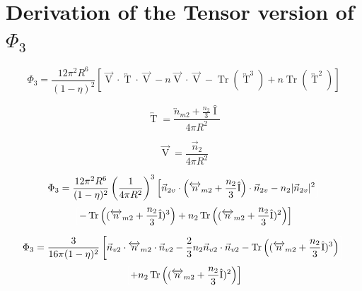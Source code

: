 \documentclass[double,12pt]{beavtex}
\begin{document}
\section{Derivation of the Tensor version of $\Phi_3$}

\begin{equation}{\Phi_3=\frac{12\pi^2R^6}{(1-\eta)^2}\left[\overrightarrow{\operatorname{V}}\cdot\overleftrightarrow{\operatorname{T}}\cdot\overrightarrow{\operatorname{V}}-n\overrightarrow{\operatorname{V}}\cdot\overrightarrow{\operatorname{V}}-\operatorname{Tr}\left(\overleftrightarrow{\operatorname{T}}^3\right)+n\operatorname{Tr}\left(\overleftrightarrow{\operatorname{T}}^2\right)\right]}\end{equation}

\begin{equation}{\overleftrightarrow{\operatorname{T}}=\frac{{\overleftrightarrow{n}_{m2}}+\frac{n_2}{3}\hat{\operatorname{I}}}{4\pi{R}^2}}\end{equation}

\begin{equation}{\overrightarrow{\operatorname{V}}=\frac{\vec{n}_2}{4\pi{R}^2}}\end{equation}

\begin{displaymath}{\Phi_3=\frac{12\pi^2R^6}{(1-\eta)^2}\left(\frac{1}{4\pi{R}^2}\right)^3\left[\vec{n}_{2v}\cdot\left({\overleftrightarrow{n}_{m2}}+\frac{n_2}{3}\hat{\operatorname{I}}\right)\cdot\vec{n}_{2v}-n_2|\vec{n}_{2v}|^2\color{white}\right]\color{black}}\end{displaymath}
\begin{equation}{\color{white}\left[\color{black} -\operatorname{Tr}\left(({\overleftrightarrow{n}_{m2}}+\frac{n_2}{3}\hat{\operatorname{I}})^3\right)   +n_2\operatorname{Tr}\left(({\overleftrightarrow{n}_{m2}}+\frac{n_2}{3}\hat{\operatorname{I}})^2\right)\right]}\end{equation}

\begin{displaymath}{\Phi_3=\frac{3}{16\pi(1-\eta)^2}\left[\vec{n}_{v2}\cdot{\overleftrightarrow{n}_{m2}}\cdot{\vec{n}_{v2}}-\frac{2}{3}n_2\vec{n}_{v2}\cdot\vec{n}_{v2}-\operatorname{Tr}\left(({\overleftrightarrow{n}_{m2}}+\frac{n_2}{3}\hat{\operatorname{I}})^3\right)\color{white}\right]\color{black}}\end{displaymath}
\begin{equation}{\color{white}\left[\color{black}+n_2\operatorname{Tr}\left((\overleftrightarrow{n}_{m2}+\frac{n_2}{3}\hat{\operatorname{I}})^2\right)\right]}\end{equation}
\end{document}

